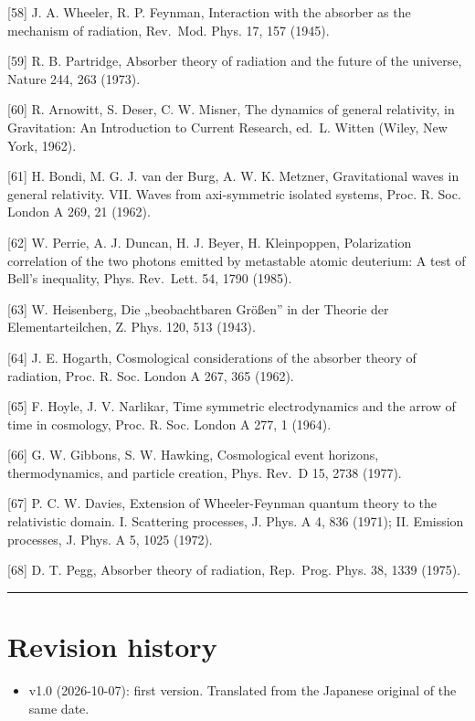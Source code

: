 \documentclass[
  a4paper,
]{article}
\providecommand{\tightlist}{%
  \setlength{\itemsep}{0pt}\setlength{\parskip}{0pt}}
\begin{document}
{[}58{]} J. A. Wheeler, R. P. Feynman, Interaction with the absorber as
the mechanism of radiation, Rev.~Mod. Phys. 17, 157 (1945).

{[}59{]} R. B. Partridge, Absorber theory of radiation and the future of
the universe, Nature 244, 263 (1973).

{[}60{]} R. Arnowitt, S. Deser, C. W. Misner, The dynamics of general
relativity, in Gravitation: An Introduction to Current Research, ed.~L.
Witten (Wiley, New York, 1962).

{[}61{]} H. Bondi, M. G. J. van der Burg, A. W. K. Metzner,
Gravitational waves in general relativity. VII. Waves from axi-symmetric
isolated systems, Proc. R. Soc. London A 269, 21 (1962).

{[}62{]} W. Perrie, A. J. Duncan, H. J. Beyer, H. Kleinpoppen,
Polarization correlation of the two photons emitted by metastable atomic
deuterium: A test of Bell's inequality, Phys. Rev.~Lett. 54, 1790
(1985).

{[}63{]} W. Heisenberg, Die „beobachtbaren Größen'' in der Theorie der
Elementarteilchen, Z. Phys. 120, 513 (1943).

{[}64{]} J. E. Hogarth, Cosmological considerations of the absorber
theory of radiation, Proc. R. Soc. London A 267, 365 (1962).

{[}65{]} F. Hoyle, J. V. Narlikar, Time symmetric electrodynamics and
the arrow of time in cosmology, Proc. R. Soc. London A 277, 1 (1964).

{[}66{]} G. W. Gibbons, S. W. Hawking, Cosmological event horizons,
thermodynamics, and particle creation, Phys. Rev.~D 15, 2738 (1977).

{[}67{]} P. C. W. Davies, Extension of Wheeler-Feynman quantum theory to
the relativistic domain. I. Scattering processes, J. Phys. A 4, 836
(1971); II. Emission processes, J. Phys. A 5, 1025 (1972).

{[}68{]} D. T. Pegg, Absorber theory of radiation, Rep.~Prog. Phys. 38,
1339 (1975).

\begin{center}\rule{0.5\linewidth}{0.5pt}\end{center}

\section{Revision history}\label{revision-history}

\begin{itemize}
\tightlist
\item
  v1.0 (2026-10-07): first version. Translated from the Japanese
  original of the same date.
\end{itemize}
\end{document}
